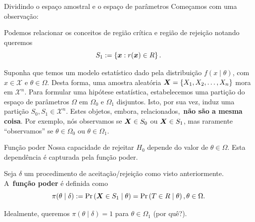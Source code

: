 \begin{frame}{Dividindo o espaço amostral e o espaço de parâmetros}
 Começamos com uma observação:
 \begin{obs}
 Podemos relacionar os conceitos de região crítica e região de rejeição notando queremos
   \[ S_1 := \left\{ \boldsymbol{x}:  r(\boldsymbol{x}) \in R \right\}. \]
\end{obs}

\begin{ideia}
\label{idea:splitting_sample_space_parameter_spaces}
 Suponha que temos um modelo estatístico dado pela distribuição $f(x\mid\theta)$, com $x \in \mathcal{X}$ e $\theta \in \Omega$.
 Desta forma, uma amostra aleatória $\boldsymbol{X} = \{ X_1, X_2, \ldots, X_n\}$ mora em $\mathcal{X}^n$.
 Para formular uma hipótese estatística, estabelecemos uma partição do espaço de parâmetros $\Omega$ em $\Omega_0$ e $\Omega_1$ disjuntos.
 Isto, por sua vez, induz uma partição $S_0, S_1 \in \mathcal{X}^n$.
 Estes objetos, embora, relacionados,~\textbf{não são a mesma coisa}.
 Por exemplo, nós observamos se $\boldsymbol{X} \in S_0$ ou $\boldsymbol{X} \in S_1$, mas raramente ``observamos'' se $\theta \in \Omega_0$ ou $\theta \in \Omega_1$.
\end{ideia}
\end{frame}

\begin{frame}{Função poder}
 Nossa capacidade de rejeitar $H_0$ depende do valor de $\theta \in \Omega$.
 Esta dependência é capturada pela função poder.
 \begin{defn}
 \label{def:power_function}
  Seja $\delta$ um procedimento de aceitação/rejeição como visto anteriormente.
  A~\textbf{função poder} é definida como 
  \begin{equation}
   \label{eq:power_function}
   \pi(\theta\mid \delta) := \operatorname{Pr}\left(\boldsymbol{X} \in S_1 \mid \theta\right) = \operatorname{Pr}\left(T \in R \mid \theta\right), \theta \in \Omega.
  \end{equation}
 \end{defn}
Idealmente, queremos $\pi(\theta \mid \delta) = 1$ para $\theta \in \Omega_1$ (por quê?).
\end{frame}

